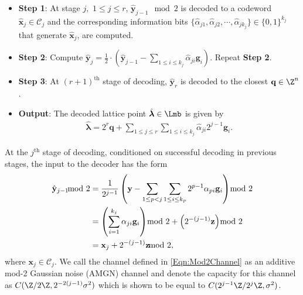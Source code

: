\documentclass[conference]{IEEEtran}
\begin{document}
\begin{itemize}
\item \textbf{Step 1}: At stage $j, $ $1\leq j\leq r$, $\hat{\mathbf{y}}_{j-1}\mod 2$ is decoded to a codeword  $\hat{\mathbf{x}}_{j}\in \mathcal{C}_{j}$ and the corresponding information
bits  $\{\hat{\alpha}_{j1},\hat{\alpha}_{j2},\cdots, \hat{\alpha}_{jk_{j}}\}\in \{0,1\}^{k_{j}}$ that generate $\hat{\mathbf{x}}_{j}$,
are computed.
\item \textbf{Step 2}: Compute $\hat{\mathbf{y}}_{j}= \frac{1}{2} \cdot(\hat{\mathbf{y}}_{j-1}-\sum_{1\leq i\leq k_{j}}\hat{\alpha}_{ji}\mathbf{g}_i)$. Repeat \textbf{Step 2}.
\item \textbf{Step 3}: At $(r+1)^{\text{th}}$ stage of decoding, $\hat{\mathbf{y}}_{r}$ is decoded to the closest $\mathbf{q}\in\Z^{n}$.
\item \textbf{Output}: The decoded lattice point $\hat{\mathbf{\boldsymbol\lambda}}\in\Lmb$ is given by
\begin{align}
    \hat{\mathbf{\boldsymbol\lambda}}=2^{r}\mathbf{q}+\sum_{1\leq j\leq r}\sum_{1\leq i\leq k_{j}}\hat{\alpha}_{ji}2^{j-1}\mathbf{g}_i.
\end{align}
\end{itemize}

At the $j^{\text{th}}$ stage of decoding, conditioned on successful decoding in previous stages, the input to the decoder has the form
\begin{align}
\hat{\mathbf{y}}_{j-1} \hspace{-8pt}\mod 2%
&=\frac{1}{2^{j-1}}\left( \mathbf{y}-\sum_{1\leq p< j}\sum_{1\leq i\leq k_{p}}2^{p-1}\alpha_{pi}\mathbf{g}_i \right) \hspace{-8pt}\mod 2\notag\\
&=\left(\sum_{i=1}^{k_{j}}\alpha_{ji}\mathbf{g}_i \right) \hspace{-8pt}\mod 2 + \left( 2^{-(j-1)}\mathbf{z} \right) \hspace{-8pt}\mod 2\notag\\
&=\mathbf{x}_{j}+2^{-(j-1)}\mathbf{z} \hspace{-8pt}\mod 2,
\label{Eqn:Mod2Channel}
\end{align}
where $\mathbf{x}_{j}\in\mathcal{C}_{j}$. We call the channel defined in \eqref{Eqn:Mod2Channel} as an additive mod-2 Gaussian noise (AMGN) channel \cite{forney2000} and denote the capacity for this channel as  $C(\Z/2\Z,2^{-2(j-1)}\sigma^{2})$ which is shown to be equal to $C(2^{j-1}\Z/2^{j}\Z,\sigma^{2})$\cite{forney2000}.
\end{document}
